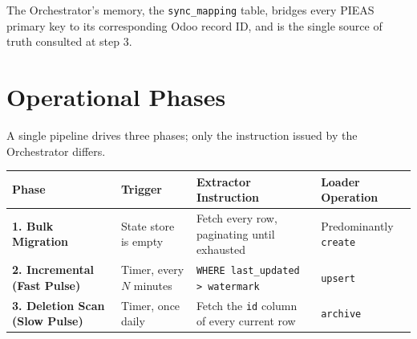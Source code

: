 \documentclass[11pt,a4paper]{article}
\begin{document}
\begin{center}
\end{center}

The Orchestrator's memory, the \texttt{sync\_mapping} table, bridges every PIEAS primary key to its corresponding Odoo record ID, and is the single source of truth consulted at step 3.

\newpage
\section{Operational Phases}

A single pipeline drives three phases; only the instruction issued by the Orchestrator differs.

\begin{table}[h]
\centering
\begin{tabularx}{\textwidth}{@{}l>{\raggedright\arraybackslash}X>{\raggedright\arraybackslash}X>{\raggedright\arraybackslash}X@{}}
\toprule
\rowcolor{navy!10}
\textbf{\color{navy}Phase} & \textbf{\color{navy}Trigger} & \textbf{\color{navy}Extractor Instruction} & \textbf{\color{navy}Loader Operation} \\
\midrule
\textbf{1. Bulk Migration} & State store is empty & Fetch every row, paginating until exhausted & Predominantly \texttt{create} \\
\textbf{2. Incremental (Fast Pulse)} & Timer, every $N$ minutes & \texttt{WHERE last\_updated > watermark} & \texttt{upsert} \\
\textbf{3. Deletion Scan (Slow Pulse)} & Timer, once daily & Fetch the \texttt{id} column of every current row & \texttt{archive} \\
\bottomrule
\end{tabularx}
\end{table}
\end{document}
